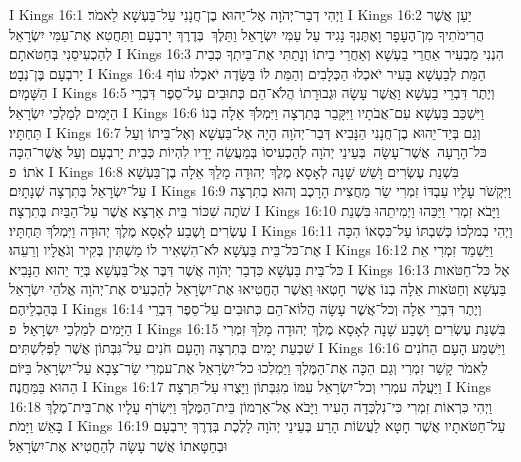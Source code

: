I Kings 16:1	וַיְהִי דְבַר־יְהֹוָה אֶל־יֵהוּא בֶן־חֲנָנִי עַל־בַּעְשָׁא לֵאמֹר׃
I Kings 16:2	יַעַן אֲשֶׁר הֲרִימֹתִיךָ מִן־הֶעָפָר וָאֶתֶּנְךָ נָגִיד עַל עַמִּי יִשְׂרָאֵל וַתֵּלֶךְ  בְּדֶרֶךְ יָרבְעָם וַתַּחֲטִא אֶת־עַמִּי יִשְׂרָאֵל לְהַכְעִיסֵנִי בְּחַטֹּאתָם׃
I Kings 16:3	הִנְנִי מַבְעִיר אַחֲרֵי בַעְשָׁא וְאַחֲרֵי בֵיתוֹ וְנָתַתִּי אֶת־בֵּיתְךָ כְּבֵית יָרבְעָם בֶּן־נְבָט׃
I Kings 16:4	הַמֵּת לְבַעְשָׁא בָּעִיר יֹאכְלוּ הַכְּלָבִים וְהַמֵּת לוֹ בַּשָּׂדֶה יֹאכְלוּ עוֹף הַשָּׁמָיִם׃
I Kings 16:5	וְיֶתֶר דִּבְרֵי בַעְשָׁא וַאֲשֶׁר עָשָׂה וּגְבוּרָתוֹ הֲלֹא־הֵם כְּתוּבִים עַל־סֵפֶר דִּבְרֵי הַיָּמִים לְמַלְכֵי יִשְׂרָאֵל׃
I Kings 16:6	וַיִּשְׁכַּב בַּעְשָׁא עִם־אֲבֹתָיו וַיִּקָּבֵר בְּתִרְצָה וַיִּמְלֹךְ אֵלָה בְנוֹ תַּחְתָּיו׃
I Kings 16:7	וְגַם בְּיַד־יֵהוּא בֶן־חֲנָנִי הַנָּבִיא דְּבַר־יְהֹוָה הָיָה אֶל־בַּעְשָׁא וְאֶל־בֵּיתוֹ וְעַל כּל־הָרָעָה  אֲשֶׁר־עָשָׂה  בְּעֵינֵי יְהֹוָה לְהַכְעִיסוֹ בְּמַעֲשֵׂה יָדָיו לִהְיוֹת כְּבֵית יָרבְעָם וְעַל אֲשֶׁר־הִכָּה אֹתוֹ׃ {פ}
I Kings 16:8	בִּשְׁנַת עֶשְׂרִים וָשֵׁשׁ שָׁנָה לְאָסָא מֶלֶךְ יְהוּדָה מָלַךְ אֵלָה בֶן־בַּעְשָׁא עַל־יִשְׂרָאֵל בְּתִרְצָה שְׁנָתָיִם׃
I Kings 16:9	וַיִּקְשֹׁר עָלָיו עַבְדּוֹ זִמְרִי שַׂר מַחֲצִית הָרָכֶב וְהוּא בְתִרְצָה שֹׁתֶה שִׁכּוֹר בֵּית אַרְצָא אֲשֶׁר עַל־הַבַּיִת בְּתִרְצָה׃
I Kings 16:10	וַיָּבֹא זִמְרִי וַיַּכֵּהוּ וַיְמִיתֵהוּ בִּשְׁנַת עֶשְׂרִים וָשֶׁבַע לְאָסָא מֶלֶךְ יְהוּדָה וַיִּמְלֹךְ תַּחְתָּיו׃
I Kings 16:11	וַיְהִי בְמלְכוֹ כְּשִׁבְתּוֹ עַל־כִּסְאוֹ הִכָּה אֶת־כּל־בֵּית בַּעְשָׁא לֹא־הִשְׁאִיר לוֹ מַשְׁתִּין בְּקִיר וְגֹאֲלָיו וְרֵעֵהוּ׃
I Kings 16:12	וַיַּשְׁמֵד זִמְרִי אֵת כּל־בֵּית בַּעְשָׁא כִּדְבַר יְהֹוָה אֲשֶׁר דִּבֶּר אֶל־בַּעְשָׁא בְּיַד יֵהוּא הַנָּבִיא׃
I Kings 16:13	אֶל כּל־חַטֹּאות בַּעְשָׁא וְחַטֹּאות אֵלָה בְנוֹ אֲשֶׁר חָטְאוּ וַאֲשֶׁר הֶחֱטִיאוּ אֶת־יִשְׂרָאֵל לְהַכְעִיס אֶת־יְהֹוָה אֱלֹהֵי יִשְׂרָאֵל בְּהַבְלֵיהֶם׃
I Kings 16:14	וְיֶתֶר דִּבְרֵי אֵלָה וְכל־אֲשֶׁר עָשָׂה הֲלוֹא־הֵם כְּתוּבִים עַל־סֵפֶר דִּבְרֵי הַיָּמִים לְמַלְכֵי יִשְׂרָאֵל׃ {פ}
I Kings 16:15	בִּשְׁנַת עֶשְׂרִים וָשֶׁבַע שָׁנָה לְאָסָא מֶלֶךְ יְהוּדָה מָלַךְ זִמְרִי שִׁבְעַת יָמִים בְּתִרְצָה וְהָעָם חֹנִים עַל־גִּבְּתוֹן אֲשֶׁר לַפְּלִשְׁתִּים׃
I Kings 16:16	וַיִּשְׁמַע הָעָם הַחֹנִים לֵאמֹר קָשַׁר זִמְרִי וְגַם הִכָּה אֶת־הַמֶּלֶךְ וַיַּמְלִכוּ כל־יִשְׂרָאֵל אֶת־עמְרִי שַׂר־צָבָא עַל־יִשְׂרָאֵל בַּיּוֹם הַהוּא בַּמַּחֲנֶה׃
I Kings 16:17	וַיַּעֲלֶה עמְרִי וְכל־יִשְׂרָאֵל עִמּוֹ מִגִּבְּתוֹן וַיָּצֻרוּ עַל־תִּרְצָה׃
I Kings 16:18	וַיְהִי כִּרְאוֹת זִמְרִי כִּי־נִלְכְּדָה הָעִיר וַיָּבֹא אֶל־אַרְמוֹן בֵּית־הַמֶּלֶךְ וַיִּשְׂרֹף עָלָיו אֶת־בֵּית־מֶלֶךְ בָּאֵשׁ וַיָּמֹת׃
I Kings 16:19	עַל־חַטֹּאתָיו אֲשֶׁר חָטָא לַעֲשׂוֹת הָרַע בְּעֵינֵי יְהֹוָה לָלֶכֶת בְּדֶרֶךְ יָרבְעָם וּבְחַטָּאתוֹ אֲשֶׁר עָשָׂה לְהַחֲטִיא אֶת־יִשְׂרָאֵל׃
